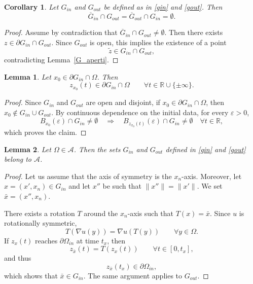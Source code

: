 \documentclass[oneside,a4paper,11pt,notitlepage]{article}
\newcommand{\Simm}{\mathcal A}
\theoremstyle{plain}
\numberwithin{teor}{section}
\numberwithin{equation}{section}
\theoremstyle{definition}
\theoremstyle{plain}
\newtheorem{lemma}[lemma]{Lemma}
\theoremstyle{plain}
\theoremstyle{plain}
\theoremstyle{plain}
\newtheorem{cor}[cor]{Corollary}
\newenvironment{corollario}{\begin{cor}}{\end{cor}}
\theoremstyle{definition}
\theoremstyle{definition}
\theoremstyle{plain}
\begin{document}
\begin{corollario}
Let $G_{in}$ and $G_{out}$ be defined as in \eqref{gin} and \eqref{gout}. Then
\[
\overline{G}_{in} \cap G_{out}
=
\overline{G}_{out} \cap G_{in}
=
\emptyset.
\]
\end{corollario}

\begin{proof}
Assume by contradiction that $\overline{G}_{in} \cap G_{out} \neq \emptyset$.
Then there exists $z \in \partial G_{in} \cap G_{out}$.
Since $G_{out}$ is open, this implies the existence of a point
\[
\tilde z \in G_{in} \cap G_{out},
\]
contradicting Lemma~\ref{G_aperti}.
\end{proof}

\begin{lemma}\label{G_aperti2}
Let $x_0 \in \partial G_{in} \cap \Omega$. Then
\[
z_{x_0}(t) \in \partial G_{in} \cap \Omega
\qquad \forall t \in \mathbb{R} \cup \{\pm \infty\}.
\]
\end{lemma}

\begin{proof}
Since $G_{in}$ and $G_{out}$ are open and disjoint, if
$x_0 \in \partial G_{in} \cap \Omega$, then
$x_0 \notin G_{in} \cup G_{out}$.
By continuous dependence on the initial data, for every $\varepsilon > 0$,
\[
B_{x_0}(\varepsilon) \cap G_{in} \neq \emptyset
\quad \Longrightarrow \quad B_{z_{x_0}(t)}(\varepsilon) 
 \cap G_{in} \neq \emptyset
\quad \forall t \in \mathbb{R},
\]
which proves the claim.
\end{proof}

\begin{lemma}\label{ginrot}
Let $\Omega \in \Simm$. Then the sets $G_{in}$ and $G_{out}$ defined in
\eqref{gin} and \eqref{gout} belong to $\Simm$.
\end{lemma}

\begin{proof}
Let us assume that the axis of symmetry is the $x_n$-axis. Moreover, let $x = (x',x_n) \in G_{in}$ and let $x''$ be such that $\|x''\| = \|x'\|$. We set $\bar{x} = (x'',x_n)$.  

There exists a rotation $T$ around the $x_n$-axis such that $T(x)=\bar{x}$.
Since $u$ is rotationally symmetric,
\[
T(\nabla u(y)) = \nabla u(T(y)) \qquad \forall y \in \Omega.
\]
If $z_x(t)$ reaches $\partial \Omega_{in}$ at time $t_x$, then
\[
z_{\bar{x}}(t) = T(z_x(t)) \qquad \forall t \in [0,t_x],
\]
and thus
\[
z_{\bar{x}}(t_x) \in \partial \Omega_{in},
\]
which shows that $\bar{x} \in G_{in}$.
The same argument applies to $G_{out}$.
\end{proof}
\end{document}
